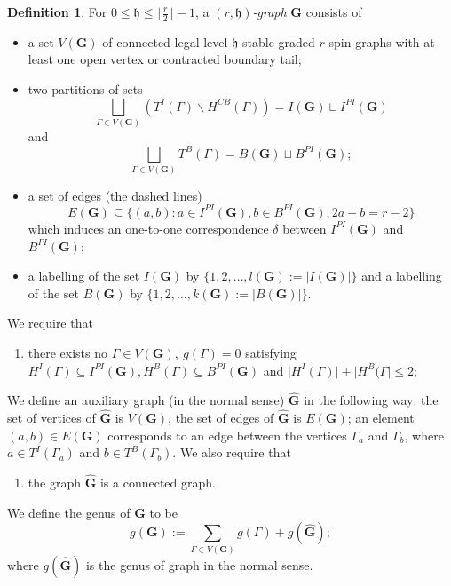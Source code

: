\documentclass[11pt,a4paper]{article}
\theoremstyle{definition}
\newtheorem{dfn}[dummy]{Definition}
\theoremstyle{remark}
\numberwithin{equation}{section}
\def\h{{\mathfrak h}}
\begin{document}
\begin{dfn}
For $0\le \h \le \lfloor\frac{r}{2}\rfloor-1$, a \textit{$(r,\h)$-graph}  $\mathbf{G}$ consists of 
\begin{itemize} 
    \item a set $V(\mathbf{G})$ of connected legal level-$\h$ stable graded $r$-spin graphs with at least one open vertex or contracted boundary tail;
    \item two partitions of sets
    $$
    \bigsqcup_{\Gamma\in V(\mathbf{G})}\left(T^I(\Gamma)\backslash H^{CB}(\Gamma)\right)=I(\mathbf{G})\sqcup I^{PI}(\mathbf{G})
    $$
    and
    $$
    \bigsqcup_{\Gamma\in V(\mathbf{G})}T^B(\Gamma)=B(\mathbf{G})\sqcup B^{PI}(\mathbf{G});
    $$
    \item a set of edges (the dashed lines) $$E(\mathbf{G})\subseteq \{(a,b)\colon a\in I^{PI}(\mathbf{G}),b\in B^{PI}(\mathbf{G}), 2a+b=r-2\}$$ which induces an one-to-one correspondence $\delta$ between $I^{PI}(\mathbf{G})$ and $B^{PI}(\mathbf{G})$;
    \item a labelling of the set $I(\mathbf{G})$ by $\{1,2,\dots,l(\mathbf{G}):=\lvert I(\mathbf{G})\rvert\}$ and a labelling of the set $B(\mathbf{G})$ by $\{1,2,\dots,k(\mathbf{G}):=\lvert B(\mathbf{G})\rvert\}$.
\end{itemize}
    We require that 
    \begin{enumerate}
        \item there exists no $\Gamma\in V(\mathbf{G}),~g(\Gamma)=0$ satisfying 
    $
    H^I(\Gamma)\subseteq I^{PI}(\mathbf{G}), H^B(\Gamma)\subseteq B^{PI}(\mathbf{G})$ 
    and $
         \lvert H^I(\Gamma)\rvert+ \lvert H^B(\Gamma\rvert \le 2;
    $
    \end{enumerate}
    We define an auxiliary graph (in the normal sense) $\hat{\mathbf{G}}$ in the following way: the set of vertices of $\hat{\mathbf{G}}$ is $V(\mathbf{G})$, the set of edges of $\hat{\mathbf{G}}$ is $E(\mathbf{G})$; an element $(a,b)\in E(\mathbf{G})$ corresponds to an edge between the vertices $\Gamma_a$ and $\Gamma_b$, where  $a\in T^I(\Gamma_a)$ and $b\in T^B(\Gamma_b)$. We also require that
\begin{enumerate}[resume*]
    \item  the graph $\hat{\mathbf{G}}$ is a connected graph.
\end{enumerate}


\end{dfn}

 We define the genus of $\mathbf{G}$ to be
$$
g(\mathbf{G}):=\sum_{\Gamma\in V(\mathbf{G})} g(\Gamma) +g(\hat{\mathbf{G}});
$$
where $g(\hat{\mathbf{G}})$ is the genus of graph in the normal sense.
\end{document}
